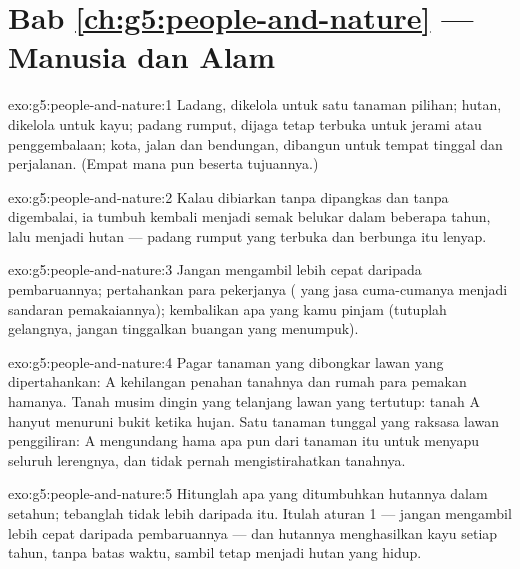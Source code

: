 \section*{Bab \ref{ch:g5:people-and-nature} --- Manusia dan Alam}

\begin{solution}{exo:g5:people-and-nature:1}
Ladang, dikelola untuk satu tanaman pilihan; hutan, dikelola untuk
kayu; padang rumput, dijaga tetap terbuka untuk jerami atau
penggembalaan; kota, jalan dan bendungan, dibangun untuk tempat
tinggal dan perjalanan. (Empat mana pun beserta tujuannya.)
\end{solution}

\begin{solution}{exo:g5:people-and-nature:2}
Kalau dibiarkan tanpa dipangkas dan tanpa digembalai, ia tumbuh
kembali menjadi semak belukar dalam beberapa tahun, lalu menjadi hutan
---  padang rumput yang terbuka dan berbunga itu lenyap.
\end{solution}

\begin{solution}{exo:g5:people-and-nature:3}
Jangan mengambil lebih cepat daripada pembaruannya; pertahankan para
pekerjanya ( yang jasa cuma-cumanya menjadi sandaran
pemakaiannya); kembalikan apa yang kamu pinjam (tutuplah gelangnya,
jangan tinggalkan buangan yang menumpuk).
\end{solution}

\begin{solution}{exo:g5:people-and-nature:4}
Pagar tanaman yang dibongkar lawan yang dipertahankan: A kehilangan
penahan tanahnya dan rumah para pemakan hamanya. Tanah musim dingin
yang telanjang lawan yang tertutup: tanah A hanyut menuruni bukit
ketika hujan. Satu tanaman tunggal yang raksasa lawan penggiliran: A
mengundang hama apa pun dari tanaman itu untuk menyapu seluruh
lerengnya, dan tidak pernah mengistirahatkan tanahnya.
\end{solution}

\begin{solution}{exo:g5:people-and-nature:5}
Hitunglah apa yang ditumbuhkan hutannya dalam setahun; tebanglah tidak
lebih daripada itu. Itulah aturan 1 --- jangan mengambil lebih cepat
daripada pembaruannya --- dan hutannya menghasilkan kayu setiap tahun,
tanpa batas waktu, sambil tetap menjadi hutan yang hidup.
\end{solution}

